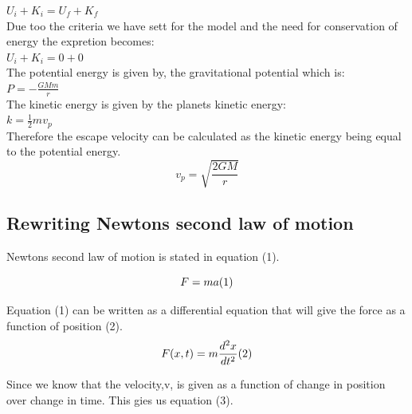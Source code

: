 \documentclass{article}
\begin{document}
    $U_i + K_i = U_f + K_f$ \\

    Due too the criteria we have sett for the model and the need for conservation of energy the expretion becomes: \\

    $U_i + K_i = 0 + 0$ \\

    The potential energy is given by, the gravitational potential which is:\\

    $P = - \frac{GMm}{r}$ \\

    The kinetic energy is given by the planets kinetic energy: \\

    $k = \frac{1}{2} mv_p$ \\

    Therefore the escape velocity can be calculated as the kinetic energy being equal to the potential energy. \\

    \begin{equation} \label{eq:escapevelocity}
        v_p =  \sqrt{\frac{2GM}{r}}
    \end{equation}


\subsection{Rewriting Newtons second law of motion} \label{sec:n2l}

    Newtons second law of motion is stated in equation (1).

    \begin{equation} \label{eq:n2l}
        F = ma  (1)\\
    \end{equation}


    Equation (1) can be written as a differential equation that will give the force as a function of position (2).\\

    \begin{equation}    \label{eq:diffn2l}
        F(x,t) = m\frac{d^{2}x}{dt^{2}} (2)\\
    \end{equation}

    Since we know that the velocity,v, is given as a function of change in position over change in time. This gies us equation (3).\\
\end{document}

